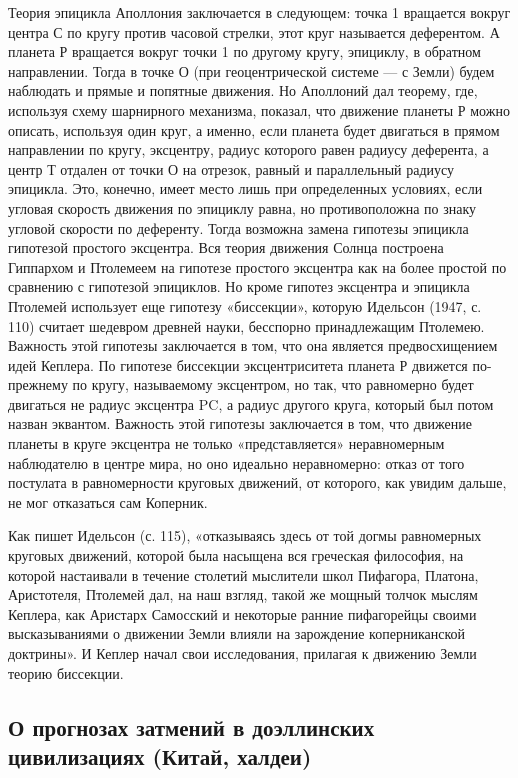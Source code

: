 Теория эпицикла Аполлония заключается в следующем: точка 1 вращается
вокруг центра С по кругу против часовой стрелки, этот круг называется
деферентом. А планета Р вращается вокруг точки 1 по другому кругу,
эпициклу, в обратном направлении. Тогда в точке О (при геоцентрической
системе --- с Земли) будем наблюдать и прямые и попятные движения. Но
Аполлоний дал теорему, где, используя схему шарнирного механизма,
показал, что движение планеты Р можно описать, используя один круг, а
именно, если планета будет двигаться в прямом направлении по кругу,
эксцентру, радиус которого равен радиусу деферента, а центр Т отдален
от точки О на отрезок, равный и параллельный радиусу эпицикла. Это,
конечно, имеет место лишь при определенных условиях, если угловая
скорость движения по эпициклу равна, но противоположна по знаку
угловой скорости по деференту. Тогда возможна замена гипотезы эпицикла
гипотезой простого эксцентра. Вся теория движения Солнца построена
Гиппархом и Птолемеем на гипотезе простого эксцентра как на более
простой по сравнению с гипотезой эпициклов. Но кроме гипотез эксцентра
и эпицикла Птолемей использует еще гипотезу «биссекции», которую
Идельсон (1947, с. 110) считает шедевром древней науки, бесспорно
принадлежащим Птолемею. Важность этой гипотезы заключается в том, что
она является предвосхищением идей Кеплера. По гипотезе биссекции
эксцентриситета планета Р движется по-прежнему по кругу, называемому
эксцентром, но так, что равномерно будет двигаться не радиус эксцентра
PC, а радиус другого круга, который был потом назван эквантом.
Важность этой гипотезы заключается в том, что движение планеты в круге
эксцентра не только «представляется» неравномерным наблюдателю в
центре мира, но оно идеально неравномерно: отказ от того постулата в
равномерности круговых движений, от которого, как увидим дальше, не
мог отказаться сам Коперник.

Как пишет Идельсон (с. 115), «отказываясь здесь от той догмы
равномерных круговых движений, которой была насыщена вся греческая
философия, на которой настаивали в течение столетий мыслители школ
Пифагора, Платона, Аристотеля, Птолемей дал, на наш взгляд, такой же
мощный толчок мыслям Кеплера, как Аристарх Самосский и некоторые
ранние пифагорейцы своими высказываниями о движении Земли влияли на
зарождение коперниканской доктрины». И Кеплер начал свои исследования,
прилагая к движению Земли теорию биссекции.

\subsection{О прогнозах затмений в доэллинских цивилизациях (Китай,
халдеи)}

